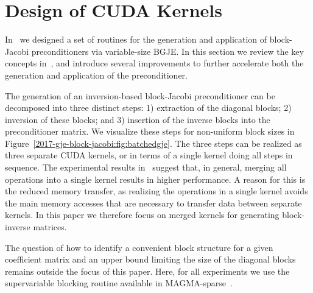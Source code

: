 \section{Design of CUDA Kernels}
\label{2017-gje-block-jacobi:sec:s3-kernel}

In~\cite{Anzt:2017:BGE:3026937.3026940} we designed a set of routines
for the generation and application of block-Jacobi preconditioners
via variable-size BGJE.
In this section we review the key concepts in~\cite{Anzt:2017:BGE:3026937.3026940},
and introduce several improvements to further accelerate both the 
generation and application of the preconditioner.

The generation of an inversion-based block-Jacobi preconditioner can be 
decomposed into three distinct steps:
1) extraction of the diagonal blocks; 2) inversion of {these blocks};
and 3) insertion of the inverse blocks into the preconditioner matrix.
We visualize these steps for non-uniform block sizes in Figure~\ref{2017-gje-block-jacobi:fig:batchedgje}.
The three steps can be realized as three separate CUDA kernels,
or in terms of a single kernel doing all steps in sequence.
The experimental results in~\cite{Anzt:2017:BGE:3026937.3026940}
suggest that, in general,
merging all operations into a single kernel results in higher performance.
A reason for this is the reduced memory transfer,
as realizing the operations in a single kernel avoids the main memory accesses that 
are necessary to transfer data {between separate kernels}.
In this paper we therefore focus on merged kernels for generating block-inverse matrices.

The question of how to identify a convenient block structure for a given 
coefficient matrix and an upper bound limiting the size of the diagonal blocks remains 
outside the focus of this paper.
Here, for all experiments we use the supervariable blocking routine
available in MAGMA-sparse~\cite{magma}.

